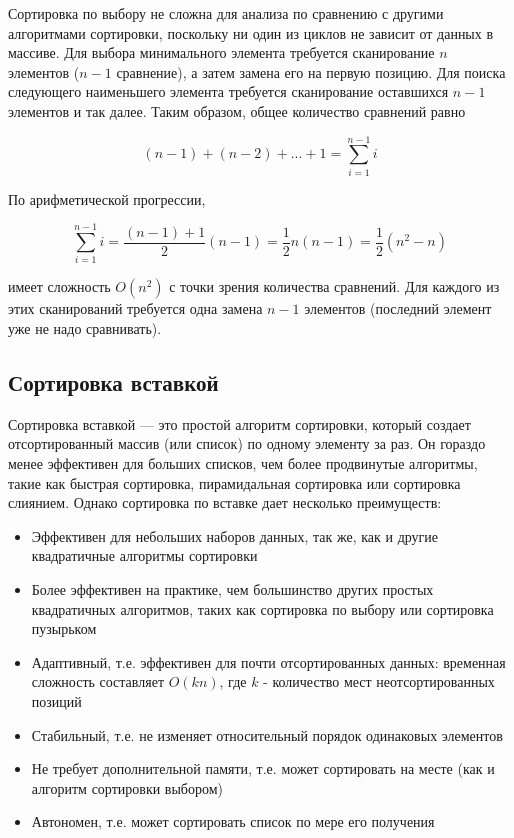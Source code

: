 Сортировка по выбору не сложна для анализа по сравнению с другими алгоритмами
сортировки, поскольку ни один из циклов не зависит от данных в массиве. Для
выбора минимального элемента требуется сканирование $n$ элементов ($n-1$
сравнение), а затем замена его на первую позицию. Для поиска следующего
наименьшего элемента требуется сканирование оставшихся $n-1$ элементов и так
далее. Таким образом, общее количество сравнений равно

$$(n-1)+(n-2)+...+1=\sum _{i=1}^{n-1}i$$

По арифметической прогрессии,

$$\sum
    _{i=1}^{n-1}i={\frac{(n-1)+1}{2}}(n-1)={\frac{1}{2}}n(n-1)={\frac{1}{2}}(n^{2}-n)$$

имеет сложность $O(n^{2})$ с точки зрения количества сравнений. Для
каждого из этих сканирований требуется одна замена $n-1$ элементов (последний
элемент уже не надо сравнивать).

\subsection{Сортировка вставкой}

Сортировка вставкой --- это простой алгоритм сортировки, который создает
отсортированный массив (или список) по одному элементу за раз. Он гораздо менее
эффективен для больших списков, чем более продвинутые алгоритмы, такие как
быстрая сортировка, пирамидальная сортировка или сортировка слиянием. Однако
сортировка по вставке дает несколько преимуществ:

\begin{itemize}
    \item Эффективен для небольших наборов данных, так же, как и другие квадратичные алгоритмы сортировки
    \item Более эффективен на практике, чем большинство других простых квадратичных алгоритмов, таких как сортировка по выбору или сортировка пузырьком
    \item Адаптивный, т.е. эффективен для почти отсортированных данных: временная сложность составляет $O(kn)$, где $k$ - количество мест неотсортированных позиций
    \item Стабильный, т.е. не изменяет относительный порядок одинаковых элементов
    \item Не требует дополнительной памяти, т.е. может сортировать на месте (как и алгоритм сортировки выбором)
    \item Автономен, т.е. может сортировать список по мере его получения
\end{itemize}

